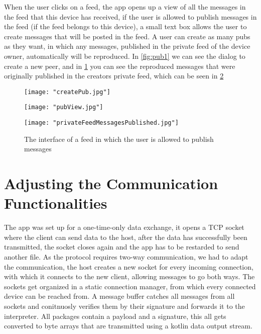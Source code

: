 When the user clicks on a feed, the app opens up a view of all the messages in the feed that this device has received, if the user is allowed to publish messages in the feed (if the feed belongs to this device), a small text box allows the user to create messages that will be posted in the feed. A user can create as many pubs as they want, in which any messages, published in the private feed of the device owner, automatically will be reproduced. In \ref{fig:pub1} we can see the dialog to create a new peer, and in \ref{fig:pub2} you can see the reproduced messages that were originally published in the creators private feed, which can be seen in \ref{fig:FeedView}
\begin{figure}
	\centering
	\begin{minipage}{.5\textwidth}
		\centering
		\texttt{[image: "createPub.jpg"]}
		\label{fig:pub1}
	\end{minipage}%
	\begin{minipage}{.5\textwidth}
		\centering
		\texttt{[image: "pubView.jpg"]}
		\label{fig:pub2}
	\end{minipage}
\end{figure}

\begin{figure}[!t]
	\centering
	\texttt{[image: "privateFeedMessagesPublished.jpg"]}
	\caption{The interface of a feed in which the user is allowed to publish messages}
	\label{fig:FeedView}
\end{figure}

\section{Adjusting the Communication Functionalities}

The app was set up for a one-time-only data exchange, it opens a TCP socket where the client can send data to the host, after the data has successfully been transmitted, the socket closes again and the app has to be restarded to send another file. As the protocol requires two-way communication, we had to adapt the communication, the host creates a new socket for every incoming connection, with which it connects to the new client, allowing messages to go both ways. The sockets get organized in a static connection manager, from which every connected device can be reached from. A message buffer catches all messages from all sockets and conitnuosly verifies them by their signature and forwards it to the interpreter. All packages contain a payload and a signature, this all gets converted to byte arrays that are transmitted using a kotlin data output stream.

